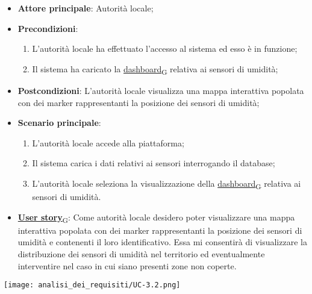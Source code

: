 \begin{itemize}
	\item \textbf{Attore principale}: Autorità locale;
	\item \textbf{Precondizioni}:
	      \begin{enumerate}
		      \item L'autorità locale ha effettuato l'accesso al sistema ed esso è in funzione;
		      \item Il sistema ha caricato la \href{https://7last.github.io/docs/rtb/documentazione-interna/glossario\#dashboard}{dashboard\textsubscript{G}} relativa ai sensori di umidità;
	      \end{enumerate}
	\item \textbf{Postcondizioni}: L'autorità locale visualizza una mappa interattiva popolata con dei marker rappresentanti la posizione dei sensori di umidità;
	\item \textbf{Scenario principale}:
	      \begin{enumerate}
		      \item L'autorità locale accede alla piattaforma;
		      \item Il sistema carica i dati relativi ai sensori interrogando il database;
		      \item L'autorità locale seleziona la visualizzazione della \href{https://7last.github.io/docs/rtb/documentazione-interna/glossario\#dashboard}{dashboard\textsubscript{G}} relativa ai sensori di umidità.
	      \end{enumerate}
	\item \href{https://7last.github.io/docs/rtb/documentazione-interna/glossario\#user-story}{\textbf{User story}\textsubscript{G}}:
	      Come autorità locale desidero poter visualizzare una mappa interattiva popolata con dei marker rappresentanti la posizione dei sensori di umidità
	      e contenenti il loro identificativo. Essa mi consentirà di visualizzare la distribuzione dei sensori di umidità nel territorio ed eventualmente interventire nel caso in cui siano presenti zone non coperte.
\end{itemize}
\begin{center}
	\texttt{[image: analisi\_dei\_requisiti/UC-3.2.png]}
\end{center}

